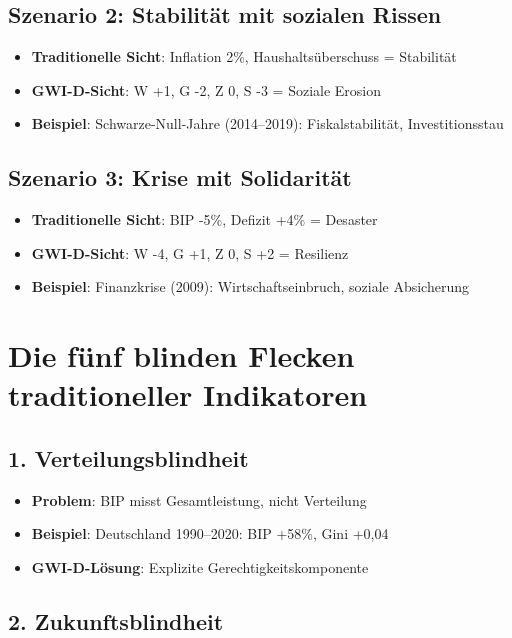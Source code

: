 \subsection{Szenario 2: Stabilität mit sozialen Rissen}

\begin{itemize}
    \item \textbf{Traditionelle Sicht}: Inflation 2\%, Haushaltsüberschuss = Stabilität
    \item \textbf{GWI-D-Sicht}: W +1, G -2, Z 0, S -3 = Soziale Erosion
    \item \textbf{Beispiel}: Schwarze-Null-Jahre (2014–2019): Fiskalstabilität, Investitionsstau
\end{itemize}

\subsection{Szenario 3: Krise mit Solidarität}

\begin{itemize}
    \item \textbf{Traditionelle Sicht}: BIP -5\%, Defizit +4\% = Desaster
    \item \textbf{GWI-D-Sicht}: W -4, G +1, Z 0, S +2 = Resilienz
    \item \textbf{Beispiel}: Finanzkrise (2009): Wirtschaftseinbruch, soziale Absicherung
\end{itemize}

\section{Die fünf blinden Flecken traditioneller Indikatoren}

\subsection{1. Verteilungsblindheit}

\begin{itemize}
    \item \textbf{Problem}: BIP misst Gesamtleistung, nicht Verteilung
    \item \textbf{Beispiel}: Deutschland 1990–2020: BIP +58\%, Gini +0,04
    \item \textbf{GWI-D-Lösung}: Explizite Gerechtigkeitskomponente
\end{itemize}

\subsection{2. Zukunftsblindheit}

